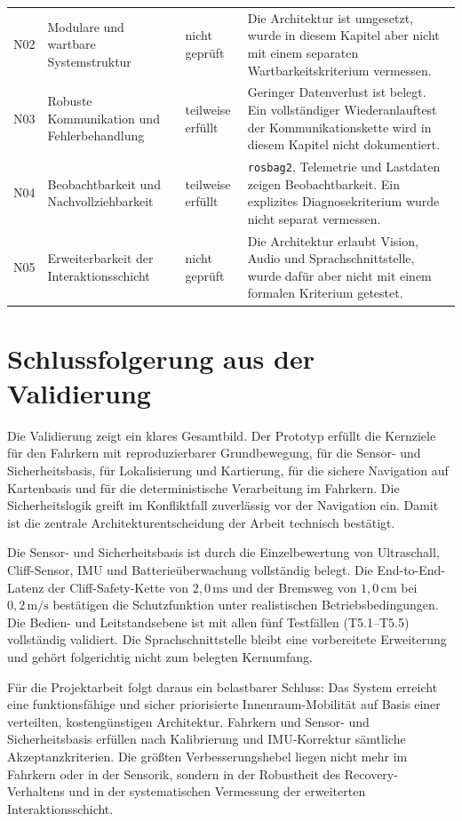 \begin{table}[htbp]
\begin{tabularx}{\textwidth}{l L l L}
    \addlinespace
    N02 & Modulare und wartbare Systemstruktur & nicht geprüft & Die Architektur ist umgesetzt, wurde in diesem Kapitel aber nicht mit einem separaten Wartbarkeitskriterium vermessen. \\
    \addlinespace
    N03 & Robuste Kommunikation und Fehlerbehandlung & teilweise erfüllt & Geringer Datenverlust ist belegt. Ein vollständiger Wiederanlauftest der Kommunikationskette wird in diesem Kapitel nicht dokumentiert. \\
    \addlinespace
    N04 & Beobachtbarkeit und Nachvollziehbarkeit & teilweise erfüllt & \texttt{rosbag2}, Telemetrie und Lastdaten zeigen Beobachtbarkeit. Ein explizites Diagnosekriterium wurde nicht separat vermessen. \\
    \addlinespace
    N05 & Erweiterbarkeit der Interaktionsschicht & nicht geprüft & Die Architektur erlaubt Vision, Audio und Sprachschnittstelle, wurde dafür aber nicht mit einem formalen Kriterium getestet. \\
    \bottomrule
  \end{tabularx}
\end{table}

\section{Schlussfolgerung aus der Validierung}

Die Validierung zeigt ein klares Gesamtbild. Der Prototyp erfüllt die Kernziele für den Fahrkern mit reproduzierbarer Grundbewegung, für die Sensor- und Sicherheitsbasis, für Lokalisierung und Kartierung, für die sichere Navigation auf Kartenbasis und für die deterministische Verarbeitung im Fahrkern. Die Sicherheitslogik greift im Konfliktfall zuverlässig vor der Navigation ein. Damit ist die zentrale Architekturentscheidung der Arbeit technisch bestätigt.

Die Sensor- und Sicherheitsbasis ist durch die Einzelbewertung von Ultraschall, Cliff-Sensor, IMU und Batterieüberwachung vollständig belegt. Die End-to-End-Latenz der Cliff-Safety-Kette von $2{,}0\,\mathrm{ms}$ und der Bremsweg von $1{,}0\,\mathrm{cm}$ bei $0{,}2\,\mathrm{m/s}$ bestätigen die Schutzfunktion unter realistischen Betriebsbedingungen. Die Bedien- und Leitstandsebene ist mit allen fünf Testfällen (T5.1--T5.5) vollständig validiert. Die Sprachschnittstelle bleibt eine vorbereitete Erweiterung und gehört folgerichtig nicht zum belegten Kernumfang.

Für die Projektarbeit folgt daraus ein belastbarer Schluss: Das System erreicht eine funktionsfähige und sicher priorisierte Innenraum-Mobilität auf Basis einer verteilten, kostengünstigen Architektur. Fahrkern und Sensor- und Sicherheitsbasis erfüllen nach Kalibrierung und IMU-Korrektur sämtliche Akzeptanzkriterien. Die größten Verbesserungshebel liegen nicht mehr im Fahrkern oder in der Sensorik, sondern in der Robustheit des Recovery-Verhaltens und in der systematischen Vermessung der erweiterten Interaktionsschicht.
